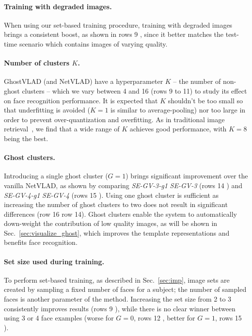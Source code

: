 \documentclass[runningheads]{llncs}
\begin{document}
\paragraph{Training with degraded images.}
When using our set-based training procedure,
training with degraded images brings a consistent boost,
as shown in rows 9 , since it better matches the test-time
scenario which contains images of varying quality.



\paragraph{Number of clusters $K$.}
GhostVLAD (and NetVLAD) have a hyperparameter $K$
-- the number of non-ghost clusters -- which we vary
between 4 and 16 (rows 9 to 11) to study its effect on
face recognition performance.
It is expected that $K$ shouldn't be too small
so that underfitting is avoided
(\eg $K=1$ is similar to average-pooling)
nor too large in order to prevent over-quantization and overfitting.
As in traditional image retrieval~\cite{Jegou10},
we find that a wide range of $K$ achieves good performance,
with $K=8$ being the best.

\paragraph{Ghost clusters.}
Introducing a single ghost cluster ($G=1$) brings significant improvement
over the vanilla NetVLAD, as shown by comparing
\emph{SE-GV-3-g1} \vs \emph{SE-GV-3} (rows 14 )
and
\emph{SE-GV-4-g1} \vs \emph{SE-GV-4} (rows 15 ).
Using one ghost cluster is sufficient as
increasing the number of ghost clusters to two does not result in
significant differences (row 16 \vs row 14).
Ghost clusters enable the system to automatically down-weight
the contribution of low quality images, as will be shown in
Sec.~\ref{sec:visualize_ghost}, which improves the template representations
and benefits face recognition.

\paragraph{Set size used during training.}
To perform set-based training, as described in Sec.~\ref{sec:imp},
image sets are created by sampling a fixed number of faces for a subject;
the number of sampled faces is another parameter of the method.
Increasing the set size from 2 to 3 consistently improves results
(rows 9 ), while there is no clear winner between using
3 or 4 face examples (worse for $G=0$, rows 12 ,
better for $G=1$, rows 15 ).
\end{document}
